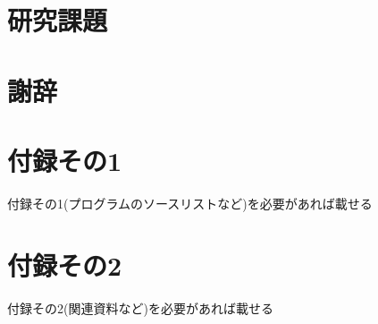 \documentclass{funthesis}
\begin{document}
\maketitle       %

\tableofcontents




\chapter{研究課題}




\chapter*{謝辞}

\nocite{*}

%
\appendix
\chapter*{付録その1} %
付録その1(プログラムのソースリストなど)を必要があれば載せる
\chapter*{付録その2}
付録その2(関連資料など)を必要があれば載せる
\listoffigures
\listoftables
\end{document}
